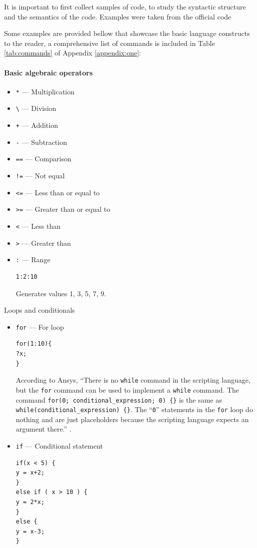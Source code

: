 It is important to first collect samples of code, to study the syntactic structure and the semantics of the code. Examples were taken from the official code 

Some examples are provided bellow that showcase the basic language constructs to the reader, a comprehensive list of commands is included in Table \ref{tab:commands} of Appendix \ref{appendix:one}:

\paragraph*{Basic algebraic operators}
\begin{itemize}
\item \texttt{*} --- Multiplication
\item \texttt{\textbackslash} --- Division
\item \texttt{+} --- Addition
\item \texttt{-} --- Subtraction
\item \texttt{==} --- Comparison
\item \texttt{!=} --- Not equal
\item \texttt{<=} --- Less than or equal to
\item \texttt{>=} --- Greater than or equal to
\item \texttt{<} --- Less than
\item \texttt{>} --- Greater than
\item \texttt{:} --- Range
\begin{lstlisting}
1:2:10
\end{lstlisting}
Generates values 1, 3, 5, 7, 9.
\end{itemize}

Loops and conditionals
\begin{itemize}
\item \texttt{for} --- For loop
\begin{lstlisting}
for(1:10){ 
?x; 
} 
\end{lstlisting}

According to Ansys, ``There is no \texttt{while} command in the scripting language, but the \texttt{for} command can be used to implement a \texttt{while} command. The command \texttt{for(0; conditional\_expression; 0) \{\}} is the same as \texttt{while(conditional\_expression) \{\}}. The ``\texttt{0}'' statements in the \texttt{for} loop do nothing and are just placeholders because the scripting language expects an argument there.'' \cite{ansys_for_command}.

\item \texttt{if} --- Conditional statement
\begin{lstlisting}
if(x < 5) {
y = x+2;
} 
else if ( x > 10 ) {
y = 2*x;
} 
else {
y = x-3;
} 
\end{lstlisting}
\end{itemize}

